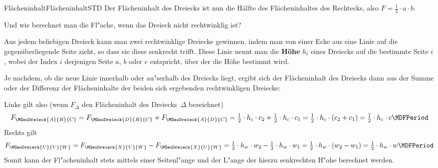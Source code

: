 \begin{MXContent}{Fl\"acheninhalt}{Fl\"acheninhalt}{STD}
Der Fl\"acheninhalt des Dreiecks ist nun die H\"alfte des Fl\"acheninhaltes 
des Rechtecks, also $ F = \frac{1}{2}\cdot a\cdot b$.

Und wie berechnet man die Fl"ache, wenn das Dreieck nicht rechtwinklig ist?

Aus jedem beliebigen Dreieck kann man zwei rechtwinklige Dreiecke gewinnen,
indem man von einer Ecke aus eine Linie auf die gegen\"uberliegende Seite zieht,
so dass sie diese senkrecht trifft. Diese Linie nennt man die 
\textbf{H\"ohe} $h_{i}$ eines Dreiecks auf die bestimmte Seite $i$, wobei 
der Index $i$ derjenigen Seite $a$, $b$ oder $c$ entspricht, \"uber der die 
H\"ohe bestimmt wird.

Je nachdem, ob die neue Linie innerhalb oder au"serhalb des Dreiecks liegt, 
ergibt sich der Fl\"acheninhalt des Dreiecks dann aus der Summe oder der 
Differenz der Fl\"acheninhalte der beiden sich ergebenden rechtwinkligen 
Dreiecke:

\begin{center}
\hspace{4em}
\end{center}

Links gilt also (wenn $F_{\Delta}$ den Fl\"acheninhalt des Dreiecks~$\Delta$ 
bezeichnet)
\[
   F_{\MGeoDreieck{A}{B}{C}}
 = F_{\MGeoDreieck{D}{B}{C}} + F_{\MGeoDreieck{A}{D}{C}}
 = \Mtfrac{1}{2} \cdot h_c \cdot c_2 + \Mtfrac{1}{2} \cdot h_c \cdot c_1
 = \Mtfrac{1}{2} \cdot h_c \cdot \left( c_2 + c_1 \right)
 = \Mtfrac{1}{2} \cdot h_c \cdot c \MDFPeriod
\]
Rechts gilt 
\[
   F_{\MGeoDreieck{U}{V}{W}}
 = F_{\MGeoDreieck{X}{V}{W}} - F_{\MGeoDreieck{X}{U}{W}}
 = \Mtfrac{1}{2} \cdot h_w \cdot w_2 - \Mtfrac{1}{2} \cdot h_w \cdot w_1
 = \Mtfrac{1}{2} \cdot h_w \cdot \left( w_2 - w_1 \right)
 = \Mtfrac{1}{2} \cdot h_w \cdot w \MDFPeriod
\]
Somit kann der Fl"acheninhalt stets mittels einer Seitenl"ange und der L"ange
der hierzu senkrechten H"ohe berechnet werden.


\end{MXContent}
